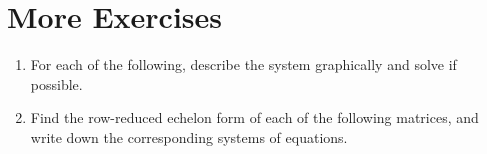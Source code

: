 \documentclass[a4paper,leqno]{article}
\numberwithin{equation}{section}
\theoremstyle{definition}
\theoremstyle{remark}
\begin{document}
\section{More Exercises}
\begin{enumerate}
  \item For each of the following, describe the system graphically and solve if possible.
    \begin{center}
      \hspace*{\fill}
    \end{center}
  \item Find the row-reduced echelon form of each of the following matrices, and write down the corresponding systems of equations.
    \begin{center}
      \hspace*{\fill}
\end{center}
\end{enumerate}
\end{document}
